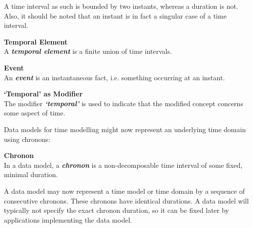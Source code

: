 A time interval as such is bounded by two instants, whereas a duration is not. Also, it should be noted that an instant is in fact a singular case of a time interval. 

\begin{svgraybox}
\vspace{-10pt}
\begin{definition}\textbf{Temporal Element}\\
A \emph{\textbf{temporal element}} is a finite union of time intervals.
\end{definition}

\begin{definition}\textbf{Event}\\
An \emph{\textbf{event}} is an instantaneous fact, i.e. something occurring at an instant.
\end{definition}

\begin{definition}\textbf{`Temporal' as Modifier}\\
The modifier \emph{\textbf{`temporal'}} is used to indicate that the modified concept concerns some aspect of time.
\end{definition}
\vspace{-10pt}
\end{svgraybox}


Data models for time modelling might now represent an underlying time domain using chronons:

\begin{svgraybox}
\vspace{-10pt}
\begin{definition}\textbf{Chronon}\\
In a data model, a \emph{\textbf{chronon}} is a non-decomposable time interval of some fixed, minimal duration.
\end{definition}
\vspace{-10pt}
\end{svgraybox}

A data model may now represent a time model or time domain by a sequence of consecutive chronons. These chronons have identical durations. A data model will typically not specify the exact chronon duration, so it can be fixed later by applications implementing the data model.

